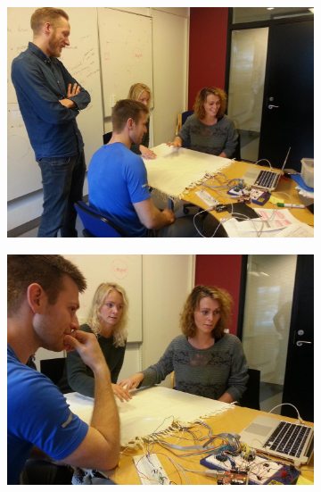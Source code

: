 \begin{figure}[t]
        \centering
        \begin{subfigure}[b]{0.44\textwidth}
                \centering
                \includegraphics[width=\textwidth]{figures/touch/evaluation/kaia-gitte-troels/alle}
                \label{fig:textiletouch:eval:kaia-gitte-troels:alle}
        \end{subfigure}%
        \hspace{0.02\textwidth}
        \begin{subfigure}[b]{0.44\textwidth}
                \centering
                \includegraphics[width=\textwidth]{figures/touch/evaluation/kaia-gitte-troels/kaia-gitte2}
                \label{fig:textiletouch:eval:kaia-gitte-troels:kaia-gitte2}
        \end{subfigure}


\end{figure}
